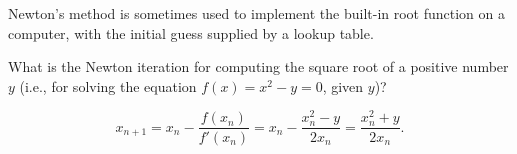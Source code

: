 \begin{pro}
  Newton's method is sometimes used to implement the built-in
  root function on a computer, with the initial guess
  supplied by a lookup table.

  What is the Newton iteration for computing the square root of a
  positive number $y$ (i.e., for solving the equation
  $f(x)=x^2-y=0$, given $y$)?
\end{pro}

\begin{sol}
  \begin{displaymath}
    x_{n+1} = x_n - \frac{f(x_n)}{f'(x_n)} = x_n - \frac{x_n^2 - y}{2x_n}
    = \frac{x_n^2 + y}{2x_n}.
  \end{displaymath}
\end{sol}
